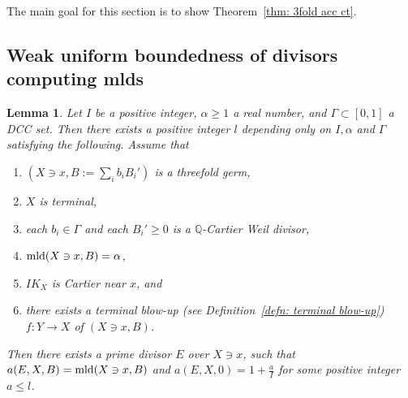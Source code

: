 \documentclass[11pt]{amsart}
\numberwithin{equation}{section}
\newcommand{\Qq}{\mathbb{Q}}
\newcommand{\mld}{{\rm{mld}}}
\newcommand{\Ii}{{\Gamma}}
\newtheorem{lem}[thm]{Lemma}
\theoremstyle{definition}
\theoremstyle{definition}
\begin{document}
The main goal for this section is to show Theorem~\ref{thm: 3fold acc ct}. 




\subsection{Weak uniform boundedness of divisors computing mlds}

\begin{lem}\label{lem: bounded index Mustata nakamura conjecture}
Let $I$ be a positive integer, $\alpha \geq 1$ a real number,  and $\Ii\subset [0,1]$ a DCC set. Then there exists a positive integer $l$ depending only on $I,\alpha$ and $\Ii$ satisfying the following. Assume that
\begin{enumerate}
    \item $(X\ni x,B:=\sum_{i} b_iB_i')$ is a threefold germ,
    \item $X$ is terminal,
    \item each $b_i\in\Ii$ and each $B_i'\geq 0$ is a $\Qq$-Cartier Weil divisor,
    \item $\mld(X\ni x,B)= \alpha$,
    \item $IK_X$ is Cartier near $x$, and
    \item there exists a terminal blow-up (see Definition~\ref{defn: terminal blow-up}) $f: Y\rightarrow X$ of $(X\ni x,B)$.
\end{enumerate}
Then there exists a prime divisor $E$ over $X\ni x$, such that $a(E,X,B)=\mld(X\ni x,B)$ and $a(E,X,0)=1+\frac{a}{I}$ for some positive integer $a\leq l$.
\end{lem}
\end{document}
